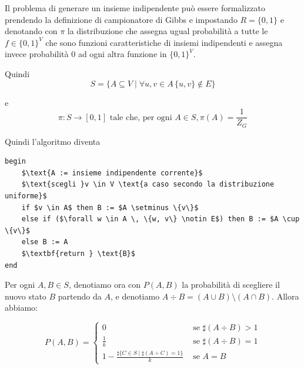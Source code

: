 \documentclass{article}
\begin{document}
Il problema di generare un insieme indipendente può essere formalizzato prendendo la definizione di campionatore di Gibbs e impostando  $ R = \{0, 1\} $ e denotando
con $ \pi $ la distribuzione che assegna ugual probabilità a tutte le $ f \in \{0, 1\}^V $ che sono funzioni caratteristiche di insiemi indipendenti e assegna invece probabilità 0 ad ogni altra funzione in $ \{0, 1\}^V $.

Quindi
\[
    S = \{ A \subseteq V \mid \forall u, v \in A \, \{u, v\} \notin E \}
\]

e \[
    \pi: S \longrightarrow[0,1] \text { tale che, per ogni } A \in S, \pi(A)=\frac{1}{Z_{G}}
\]

Quindi l'algoritmo diventa 
\begin{lstlisting}
begin
    $\text{A := insieme indipendente corrente}$
    $\text{scegli }v \in V \text{a caso secondo la distribuzione uniforme}$
    if $v \in A$ then B := $A \setminus \{v\}$
    else if ($\forall w \in A \, \{w, v\} \notin E$) then B := $A \cup \{v\}$
    else B := A
    $\textbf{return } \text{B}$
end
\end{lstlisting}
Per ogni $ A, B \in S $, denotiamo ora con $ P(A, B) $ la probabilità di scegliere il nuovo stato $ B $ partendo da $ A $, e denotiamo $A \div B = (A \cup B) \setminus (A \cap B)$. Allora abbiamo:

\[
    P(A, B)=\left\{\begin{array}{ll}
0 & \text { se } \sharp(A \div B)>1 \\
\frac{1}{k} & \text { se } \sharp(A \div B)=1 \\
1-\frac{\sharp\{C \in S \mid \sharp(A \div C)=1\}}{k} & \text { se } A=B
\end{array}\right.
\]
\end{document}
